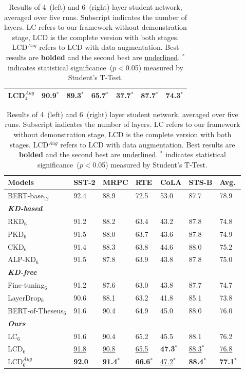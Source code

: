 \begin{table}[t]
\begin{tabular}{l|lllll|l}
    LCD$_4^{Aug}$       & \textbf{90.9$^*$}  & \textbf{89.3$^*$} & \textbf{65.7$^*$} & \textbf{37.7$^*$} & \textbf{87.7$^*$}  & \textbf{74.3$^*$} \\
    \bottomrule
    \end{tabular}
  \quad
  \quad
    \centering
    \scriptsize
    \begin{tabular}{l|lllll|l}
    \toprule
    Models            & SST-2 & MRPC & RTE  & CoLA & STS-B & Avg.  \\
    \midrule
    BERT-base$_{12}$         & 92.4  & 88.9 & 72.5 & 53.0 & 87.7  & 78.9 \\
    \midrule
    \cellcolor[HTML]{EFEFEF}\textbf{\textit{KD-based}}  & & & & & & \\
    RKD$_6$               &91.2   &88.2  &63.4  &43.2  &87.8   &74.8  \\
    PKD$_6$               &91.5   &88.0  &63.7  &43.6  &87.8   &74.9  \\
    CKD$_6$               &91.4   &88.3  &63.8  &44.6  &88.0   &75.2  \\
    ALP-KD$_6$            &91.5   &87.8  &63.9  &43.8  &87.8   &75.0  \\
    \midrule
    \cellcolor[HTML]{EFEFEF}\textbf{\textit{KD-free}}  & & & & & & \\
    Fine-tuning$_6$       &91.2   &87.6  &63.0  &43.8  &87.7   &74.7  \\
    LayerDrop$_6$         &90.6   &88.1  &63.2  &41.8  &85.1   &73.8  \\
    BERT-of-Theseus$_6$   &91.6   &90.4  &64.9  &45.0  &88.0   &76.0  \\
    \midrule
    \cellcolor[HTML]{EFEFEF}\textbf{\textit{Ours}}  & & & & & & \\
    LC$_6$                &91.6   &90.4  &65.2  &45.5  &88.1   &76.2  \\
    LCD$_6$               & \underline{91.8}  & \underline{90.8} & \underline{65.5} & \textbf{47.3$^*$} & \underline{88.3$^*$}  & \underline{76.8} \\
    LCD$_6^{Aug}$       & \textbf{92.0}  & \textbf{91.4$^*$} & \textbf{66.6$^*$} & \underline{47.2$^*$} & \textbf{88.4$^*$}  & \textbf{77.1$^*$} \\
    \bottomrule
    \end{tabular}
    \caption{Results of 4~(left) and 6~(right) layer student network, averaged over five runs. Subscript indicates the number of layers. LC refers to our framework without demonstration stage, LCD is the complete version with both stages. LCD$^{Aug}$ refers to LCD with data augmentation. 
    Best results are \textbf{bolded} and the second best are \underline{underlined}. $^*$ indicates statistical significance~($p<$0.05) measured by Student's T-Test.}
    \label{table:main}
  \end{table}

